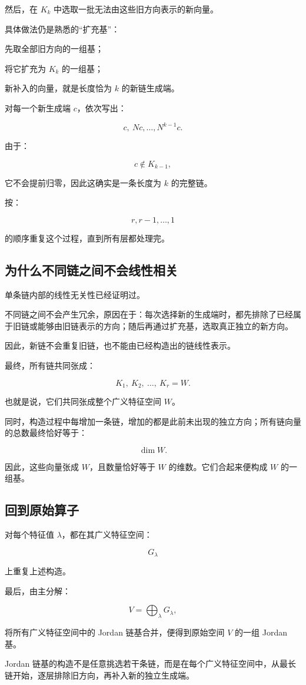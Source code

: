 然后，在 $K_k$ 中选取一批无法由这些旧方向表示的新向量。

具体做法仍是熟悉的“扩充基”：

\begin{jenum}
\item %
先取全部旧方向的一组基；
\item %
将它扩充为 $K_k$ 的一组基；
\item %
新补入的向量，就是长度恰为 $k$ 的新链生成端。
\end{jenum}

对每一个新生成端 $c$，依次写出：

\[
c,\ Nc,\ldots,N^{k-1}c.
\]

由于：

\[
c\notin K_{k-1},
\]

它不会提前归零，因此这确实是一条长度为 $k$ 的完整链。

按：

\[
r,r-1,\ldots,1
\]

的顺序重复这个过程，直到所有层都处理完。

\subsection{为什么不同链之间不会线性相关}

单条链内部的线性无关性已经证明过。

不同链之间不会产生冗余，原因在于：每次选择新的生成端时，都先排除了已经属于旧链或能够由旧链表示的方向；随后再通过扩充基，选取真正独立的新方向。

因此，新链不会重复旧链，也不能由已经构造出的链线性表示。

最终，所有链共同张成：

\[
K_1,\ K_2,\ \ldots,\ K_r=W.
\]

也就是说，它们共同张成整个广义特征空间 $W$。

同时，构造过程中每增加一条链，增加的都是此前未出现的独立方向；所有链向量的总数最终恰好等于：

\[
\dim W.
\]

因此，这些向量张成 $W$，且数量恰好等于 $W$ 的维数。它们合起来便构成 $W$ 的一组基。

\subsection{回到原始算子}

对每个特征值 $\lambda$，都在其广义特征空间：

\[
G_\lambda
\]

上重复上述构造。

最后，由主分解：

\[
V=\bigoplus_\lambda G_\lambda,
\]

将所有广义特征空间中的 Jordan 链基合并，便得到原始空间 $V$ 的一组 Jordan 基。

\begin{jinsight}
Jordan 链基的构造不是任意挑选若干条链，而是在每个广义特征空间中，从最长链开始，逐层排除旧方向，再补入新的独立生成端。
\end{jinsight}
